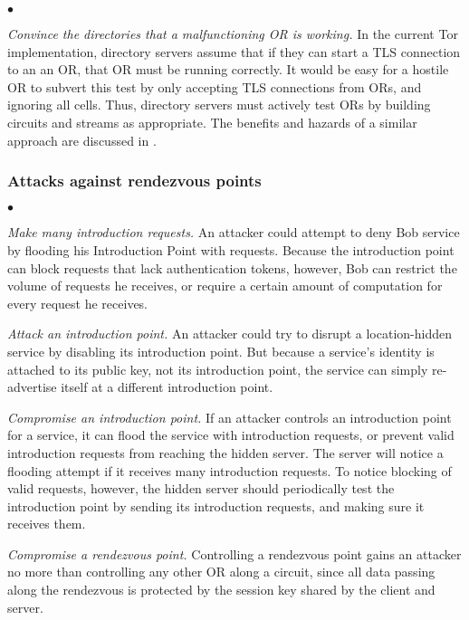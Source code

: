 \documentclass[times,10pt,twocolumn]{article}
\newenvironment{tightlist}{\begin{list}{$\bullet$}{
  \setlength{\itemsep}{0mm}
    \setlength{\parsep}{0mm}
    }}{\end{list}}
\begin{document}
\begin{tightlist}
\item \emph{Convince the directories that a malfunctioning OR is
  working.}  In the current Tor implementation, directory servers
  assume that if they can start a TLS connection to an an OR, that OR
  must be running correctly.  It would be easy for a hostile OR to
  subvert this test by only accepting TLS connections from ORs, and
  ignoring all cells. Thus, directory servers must actively test ORs
  by building circuits and streams as appropriate.  The benefits and
  hazards of a similar approach are discussed in \cite{mix-acc}.
  
\end{tightlist}

\subsubsection*{Attacks against rendezvous points}
\begin{tightlist}
\item \emph{Make many introduction requests.}  An attacker could
  attempt to deny Bob service by flooding his Introduction Point with
  requests.  Because the introduction point can block requests that
  lack authentication tokens, however, Bob can restrict the volume of
  requests he receives, or require a certain amount of computation for
  every request he receives.
  
\item \emph{Attack an introduction point.} An attacker could try to
  disrupt a location-hidden service by disabling its introduction
  point.  But because a service's identity is attached to its public
  key, not its introduction point, the service can simply re-advertise
  itself at a different introduction point.

\item \emph{Compromise an introduction point.} If an attacker controls
  an introduction point for a service, it can flood the service with
  introduction requests, or prevent valid introduction requests from
  reaching the hidden server.  The server will notice a flooding
  attempt if it receives many introduction requests.  To notice
  blocking of valid requests, however, the hidden server should
  periodically test the introduction point by sending its introduction
  requests, and making sure it receives them.

\item \emph{Compromise a rendezvous point.}  Controlling a rendezvous
  point gains an attacker no more than controlling any other OR along
  a circuit, since all data passing along the rendezvous is protected
  by the session key shared by the client and server.

\end{tightlist}
\end{document}
